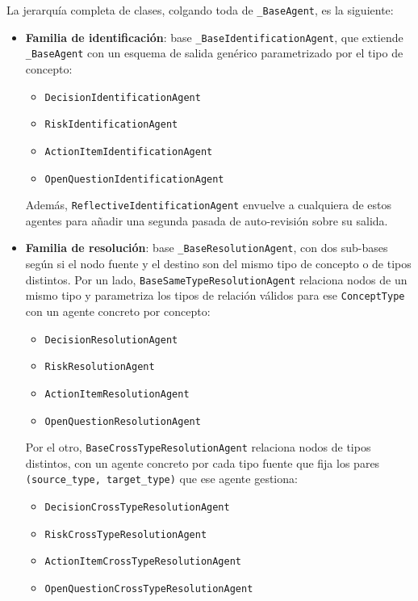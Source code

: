 La jerarquía completa de clases, colgando toda de \texttt{\_BaseAgent}, es la siguiente:

\begin{itemize}
  \item \textbf{Familia de identificación}: base \texttt{\_BaseIdentificationAgent}, que extiende
        \texttt{\_BaseAgent} con un esquema de salida genérico parametrizado por el tipo de
        concepto:
        \begin{itemize}
          \item \texttt{DecisionIdentificationAgent}
          \item \texttt{RiskIdentificationAgent}
          \item \texttt{ActionItemIdentificationAgent}
          \item \texttt{OpenQuestionIdentificationAgent}
        \end{itemize}

        Además, \texttt{ReflectiveIdentificationAgent} envuelve a cualquiera de estos agentes para
        añadir una segunda pasada de auto-revisión sobre su salida.

  \item \textbf{Familia de resolución}: base \texttt{\_BaseResolutionAgent}, con dos sub-bases
        según si el nodo fuente y el destino son del mismo tipo de concepto o de tipos distintos.
        Por un lado, \texttt{BaseSameTypeResolutionAgent} relaciona nodos de un mismo tipo y
        parametriza los tipos de relación válidos para ese \texttt{ConceptType} con un agente
        concreto por concepto:
        \begin{itemize}
          \item \texttt{DecisionResolutionAgent}
          \item \texttt{RiskResolutionAgent}
          \item \texttt{ActionItemResolutionAgent}
          \item \texttt{OpenQuestionResolutionAgent}
        \end{itemize}

        Por el otro, \texttt{BaseCrossTypeResolutionAgent} relaciona nodos de tipos distintos, con un
        agente concreto por cada tipo fuente que fija los pares \texttt{(source\_type, target\_type)}
        que ese agente gestiona:
        \begin{itemize}
          \item \texttt{DecisionCrossTypeResolutionAgent}
          \item \texttt{RiskCrossTypeResolutionAgent}
          \item \texttt{ActionItemCrossTypeResolutionAgent}
          \item \texttt{OpenQuestionCrossTypeResolutionAgent}
        \end{itemize}


\end{itemize}
